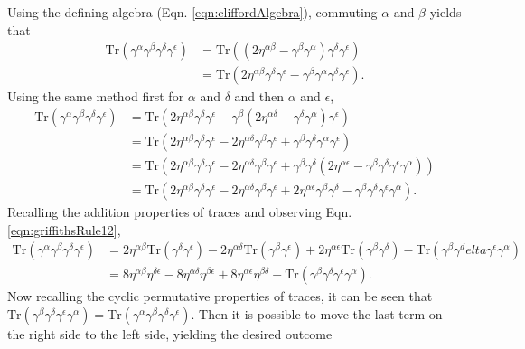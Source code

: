 Using the defining algebra (Eqn. \ref{eqn:cliffordAlgebra}), commuting $\alpha$ and $\beta$ yields
that
\begin{align*}
\text{Tr}(\gamma^\alpha\gamma^\beta\gamma^\delta\gamma^\epsilon)&=\text{Tr}((2\eta^{\alpha\beta}-\gamma^\beta\gamma^\alpha)\gamma^\delta\gamma^\epsilon)\\
&=\text{Tr}(2\eta^{\alpha\beta}\gamma^\delta\gamma^\epsilon-\gamma^\beta\gamma^\alpha\gamma^\delta\gamma^\epsilon).
\end{align*}
Using the same method first for $\alpha$ and $\delta$ and then $\alpha$ and $\epsilon$,
\begin{align*}
\text{Tr}(\gamma^\alpha\gamma^\beta\gamma^\delta\gamma^\epsilon)
&=\text{Tr}(2\eta^{\alpha\beta}\gamma^\delta\gamma^\epsilon-\gamma^\beta(2\eta^{\alpha\delta}-\gamma^\delta\gamma^\alpha)\gamma^\epsilon)\\
&=\text{Tr}(2\eta^{\alpha\beta}\gamma^\delta\gamma^\epsilon-2\eta^{\alpha\delta}\gamma^\beta\gamma^\epsilon+\gamma^\beta\gamma^\delta\gamma^\alpha\gamma^\epsilon)\\
&=\text{Tr}(2\eta^{\alpha\beta}\gamma^\delta\gamma^\epsilon-2\eta^{\alpha\delta}\gamma^\beta\gamma^\epsilon+\gamma^\beta\gamma^\delta(2\eta^{\alpha\epsilon}-\gamma^\beta\gamma^\delta\gamma^\epsilon\gamma^\alpha))\\
&=\text{Tr}(2\eta^{\alpha\beta}\gamma^\delta\gamma^\epsilon-2\eta^{\alpha\delta}\gamma^\beta\gamma^\epsilon+2\eta^{\alpha\epsilon}\gamma^\beta\gamma^\delta-\gamma^\beta\gamma^\delta\gamma^\epsilon\gamma^\alpha).
\end{align*}
Recalling the addition properties of traces and observing Eqn. \ref{eqn:griffithsRule12},
\begin{align*}
\text{Tr}(\gamma^\alpha\gamma^\beta\gamma^\delta\gamma^\epsilon)
&=2\eta^{\alpha\beta}\text{Tr}(\gamma^\delta\gamma^\epsilon)-2\eta^{\alpha\delta}\text{Tr}(\gamma^\beta\gamma^\epsilon)+2\eta^{\alpha\epsilon}\text{Tr}(\gamma^\beta\gamma^\delta)-\text{Tr}(\gamma^\beta\gamma^delta\gamma^\epsilon\gamma^\alpha)\\
&=8\eta^{\alpha\beta}\eta^{\delta\epsilon}-8\eta^{\alpha\delta}\eta^{\beta\epsilon}+8\eta^{\alpha\epsilon}\eta^{\beta\delta}-\text{Tr}(\gamma^\beta\gamma^\delta\gamma^\epsilon\gamma^\alpha).
\end{align*}
Now recalling the cyclic permutative properties of traces, it can be seen that $\text{Tr}(\gamma^\beta\gamma^\delta\gamma^\epsilon\gamma^\alpha)=\text{Tr}(\gamma^\alpha\gamma^\beta\gamma^\delta\gamma^\epsilon)$. Then it is possible to move the last term on the right side to the left side, yielding the desired outcome
